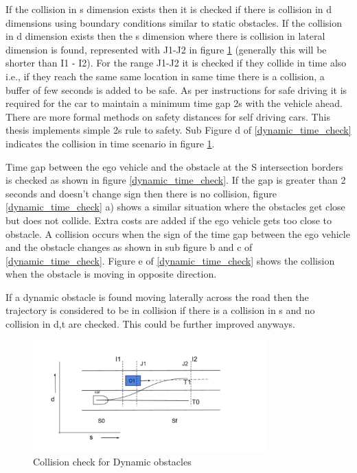 If the collision in s dimension exists then it is checked if there is collision in d dimensions using boundary conditions similar to static obstacles. If the collision in d dimension exists then the s dimension where there is collision in lateral dimension is found, represented with J1-J2 in figure \ref{dynamic_check} (generally this will be shorter than I1 - I2). For the range J1-J2 it is checked if they collide in time also i.e., if they reach the same same location in same time there is a collision, a buffer of few seconds is added to be safe. As per instructions for safe driving it is required for the car to maintain a minimum time gap 2s with the vehicle ahead. There are more formal methods \cite{mobile_eye_safety_distance} on safety distances for self driving cars. This thesis implements simple 2s rule to safety. Sub Figure d of \ref{dynamic_time_check} indicates the collision in time scenario in figure \ref{dynamic_check}.

Time gap between the ego vehicle and the obstacle at the S intersection borders is checked as shown in figure \ref{dynamic_time_check}. If the gap is greater than 2 seconds and doesn't change sign then there is no collision, figure \ref{dynamic_time_check} a) shows a similar situation where the obstacles get close but does not collide. Extra costs are added if the ego vehicle gets too close to obstacle. A collision occurs when the sign of the time gap between the ego vehicle and the obstacle changes as shown in sub figure b and c of \ref{dynamic_time_check}. Figure e of \ref{dynamic_time_check} shows the collision when the obstacle is moving in opposite direction. 

If a dynamic obstacle is found moving laterally across the road then the trajectory is considered to be in collision if there is a collision in s and no collision in d,t are checked. This could be further improved anyways.  




 \begin{figure}[H]
    \centering
    \includegraphics[width=0.8\textwidth]{Images/dynamic_check.png}
    \caption{Collision check for Dynamic obstacles}
    \label{dynamic_check}
\end{figure}

